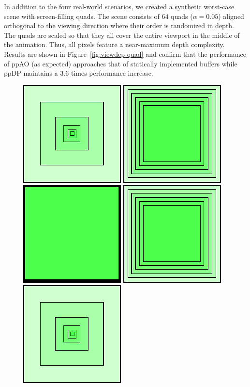 \documentclass{egpubl}
\newcommand{\stencil}{ppAO}
\newcommand{\dloop}{ppDP}
\begin{document}
In addition to the four real-world scenarios, we created a synthetic worst-case scene with screen-filling quads.
The scene consists of $64$ quads ($\alpha=0.05$) aligned orthogonal to the viewing direction where their order is randomized in depth. 
The quads are scaled so that they all cover the entire viewport in the middle of the animation.
Thus, all pixels feature a near-maximum depth complexity.
Results are shown in Figure~\ref{fig:viewdep-quad} and confirm that the performance of \stencil{} (as expected) approaches that of statically implemented buffers while \dloop{} maintains a $3.6$ times performance increase. 



\begin{figure}[t]
  \centering
  \begin{minipage}{1.0\linewidth}\centering 
    \includegraphics[width=0.14\linewidth]{figures/quads1}\hfill 
    \includegraphics[width=0.14\linewidth]{figures/quads2}\hfill 
    \includegraphics[width=0.14\linewidth]{figures/quads3}\hfill 
    \includegraphics[width=0.14\linewidth]{figures/quads2}\hfill 
    \includegraphics[width=0.14\linewidth]{figures/quads1}\hfill \hspace{6mm}
  \end{minipage}
  \begin{minipage}{1.0\linewidth}\centering

\end{minipage}
\end{figure}
\end{document}
